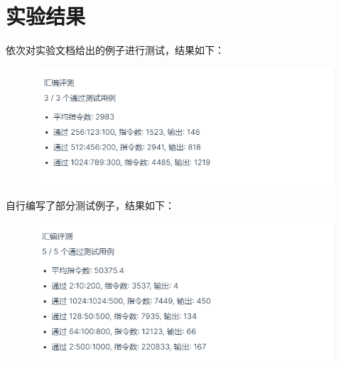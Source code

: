 \documentclass[12pt, a4paper, oneside]{ctexart}
\begin{document}
\section*{实验结果}
依次对实验文档给出的例子进行测试，结果如下：
\begin{figure}[H]
    \centering
    \includegraphics[scale=0.8]{Output1.png}
\end{figure}
自行编写了部分测试例子，结果如下：
\begin{figure}[H]
    \centering
    \includegraphics[scale=0.8]{Output2.png}
\end{figure}
\end{document}

